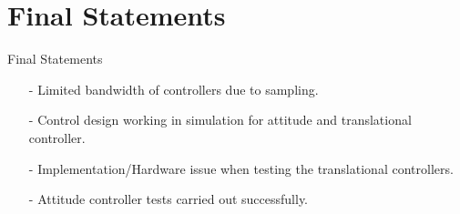 \section{Final Statements}
\begin{frame}{Final Statements}{}
    \begin{itemize} 
        \item[-] Limited bandwidth of controllers due to sampling.
        \item[-] Control design working in simulation for attitude and translational controller. 
        \item[-] Implementation/Hardware issue when testing the translational controllers.
        \item[-] Attitude controller tests carried out successfully.
    \end{itemize}   
\end{frame}